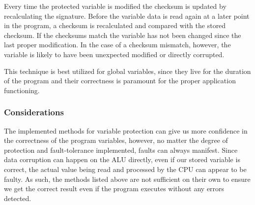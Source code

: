 Every time the protected variable is modified the checksum is updated by recalculating the signature. Before the variable data is read again at a later point in the program, a checksum is recalculated and compared with the stored checksum. If the checksums match the variable has not been changed since the last proper modification. In the case of a checksum mismatch, however, the variable is likely to have been unexpected modified or directly corrupted.

This technique is best utilized for global variables, since they live for the duration of the program and their correctness is paramount for the proper application functioning.

\subsubsection{Considerations}

The implemented methods for variable protection can give us more confidence in the correctness of the program variables, however, no matter the degree of protection and fault-tolerance implemented, faults can always manifest. Since data corruption can happen on the ALU directly, even if our stored variable is correct, the actual value being read and processed by the CPU can appear to be faulty. As such, the methods listed above are not sufficient on their own to ensure we get the correct result even if the program executes without any errors detected.
